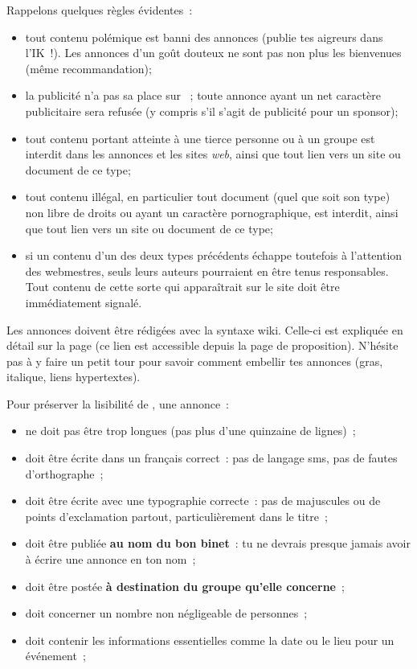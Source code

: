 Rappelons quelques règles évidentes~:
\begin{itemize}
 \item tout contenu polémique est banni des annonces (publie tes aigreurs dans l'IK~!).
       Les annonces d'un goût douteux ne sont pas non plus les bienvenues (même recommandation);
 \item la publicité n'a pas sa place sur \fkz~; toute annonce ayant un net caractère publicitaire
       sera refusée (y compris s'il s'agit de publicité pour un sponsor);
 \item tout contenu portant atteinte à  une tierce personne ou à  un groupe est interdit dans les annonces
       et les sites \emph{web}, ainsi que tout lien vers un site ou document de ce type;
 \item tout contenu illégal, en particulier tout document (quel que soit son type)
       non libre de droits ou ayant un caractère pornographique, est interdit,
       ainsi que tout lien vers un site ou document de ce type;
 \item si un contenu d'un des deux types précédents échappe toutefois à  l'attention des webmestres,
       seuls leurs auteurs pourraient en être tenus responsables.
       Tout contenu de cette sorte qui apparaîtrait sur le site doit être immédiatement signalé.
\end{itemize}

Les annonces doivent être rédigées avec la syntaxe wiki. Celle-ci est expliquée en détail sur la page  (ce lien est accessible depuis la page de proposition). N'hésite pas à  y faire un petit tour pour savoir comment embellir tes annonces (gras, italique, liens hypertextes).

Pour préserver la lisibilité de \fkz, une annonce~:
\begin{itemize}
 \item ne doit pas être trop longues (pas plus d'une quinzaine de lignes)~;
 \item doit être écrite dans un français correct~: pas de langage sms, pas de fautes d'orthographe~;
 \item doit être écrite avec une typographie correcte~: pas de majuscules ou de points d'exclamation partout, particulièrement dans le titre~;
 \item doit être publiée \textbf{au nom du bon binet}~: tu ne devrais presque jamais avoir à écrire une annonce en ton nom~;
 \item doit être postée \textbf{à destination du groupe qu'elle concerne}~;
 \item doit concerner un nombre non négligeable de personnes~;
 \item doit contenir les informations essentielles comme la date ou le lieu pour un événement~;
\end{itemize}



